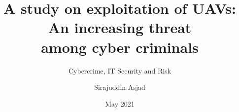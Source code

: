 \documentclass[aspectratio=1610]{beamer}
\title[UAV Security - Portfolio assignment]{A study on exploitation of UAVs: An increasing threat\\among cyber criminals}
\subtitle{Cybercrime, IT Security and Risk}
\author{Sirajuddin Asjad}
\date{May 2021}
\institute[USN]{University of South-Eastern Norway\\Campus Kongsberg}
\begin{document}
    \frame{\titlepage}
    
    
\end{document}
